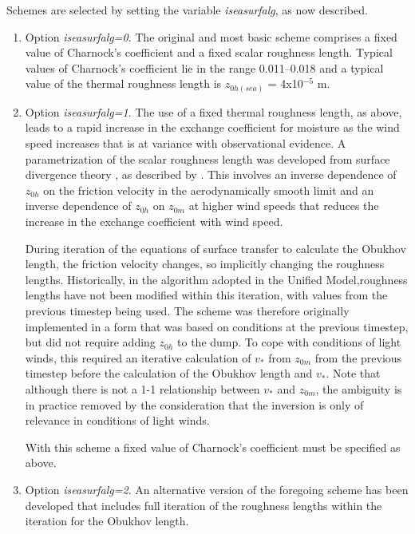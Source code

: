 \documentclass{UMDP_article}
\begin{document}
Schemes are selected by setting the variable {\sl iseasurfalg}, as now
described.
\begin{enumerate}
\item Option {\sl iseasurfalg=0}.  The original and most basic scheme
  comprises a fixed value of Charnock's coefficient and a fixed scalar
  roughness length. Typical values of Charnock's coefficient lie in
  the range 0.011--0.018 and a typical value of the thermal roughness
  length is $z_{0h(sea)}$ = 4x10$^{-5}$ m.

\item Option {\sl iseasurfalg=1}.  The use of a fixed thermal
  roughness length, as above, leads to a rapid increase in the
  exchange coefficient for moisture as the wind speed increases that
  is at variance with observational evidence. A parametrization of the
  scalar roughness length was developed from surface divergence theory
  \cite[]{csanady2001}, as described by \cite{edwards2007}.  This
  involves an inverse dependence of $z_{0h}$ on the friction velocity
  in the aerodynamically smooth limit and an inverse dependence of
  $z_{0h}$ on $z_{0m}$ at higher wind speeds that reduces the increase
  in the exchange coefficient with wind speed.

  During iteration of the equations of surface transfer to calculate
  the Obukhov length, the friction velocity changes, so implicitly
  changing the roughness lengths. Historically, in the algorithm
  adopted in the Unified Model,roughness lengths have not been
  modified within this iteration, with values from the previous
  timestep being used. The scheme was therefore originally implemented
  in a form that was based on conditions at the previous timestep, but
  did not require adding $z_{0h}$ to the dump. To cope with conditions
  of light winds, this required an iterative calculation of $v_\ast$
  from $z_{0m}$ from the previous timestep before the calculation of
  the Obukhov length and $v_\ast$. Note that although there is not a
  1-1 relationship between $v_\ast$ and $z_{0m}$, the ambiguity is in
  practice removed by the consideration that the inversion is only of
  relevance in conditions of light winds.

  With this scheme a fixed value of Charnock's coefficient must be
  specified as above.

\item Option {\sl iseasurfalg=2}.  An alternative version of the
  foregoing scheme has been developed that includes full iteration of
  the roughness lengths within the iteration for the Obukhov length.


\end{enumerate}
\end{document}
